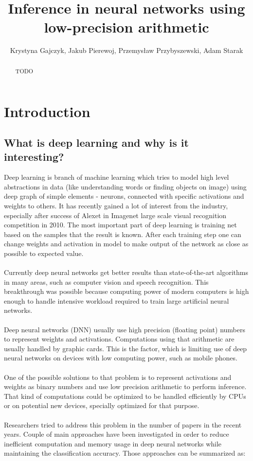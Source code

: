\documentclass[licencjacka]{pracamgr}
\title{Inference in neural networks using low-precision arithmetic}
\author{Krystyna Gajczyk, Jakub Pierewoj, Przemysław Przybyszewski, Adam Starak}
\begin{document}
\maketitle
\begin{abstract}
TODO
\end{abstract}

\tableofcontents

\chapter{Introduction}

	\section{What is deep learning and why is it interesting?}

	Deep learning is branch of machine learning which tries to model high level abstractions in data (like understanding words or finding objects on image) using deep graph of simple elements - neurons, connected with specific activations and weights to others. It has recently gained a lot of interest from the industry, especially after success of Alexet in Imagenet large scale visual recognition competition in 2010.
	The most important part of deep learning is training net based on the samples that the result is known. After each training step one can change weights and activation in model to make output of the network as close as possible to expected value.
	\\\\
	Currently deep neural networks get better results than state-of-the-art algorithms in many areas, such as computer vision and speech recognition. This breakthrough was possible because computing power of modern computers is high enough to handle intensive workload required to train large artificial neural networks.
	\\\\
	Deep neural networks (DNN) usually use high precision (floating point) numbers to represent
	weights and activations. Computations using that arithmetic are usually handled by
	graphic cards. This is the factor, which is limiting use of deep neural networks on devices with low computing power, such as mobile phones.
	\\\\
	One of the possible solutions to that problem is to represent activations and weights as
	binary numbers and use low precision arithmetic to perform inference. That kind of computations could be optimized to be handled efficiently by CPUs or on potential new devices, specially optimized for that purpose. 
	\\\\
	Researchers tried to address this problem in the number of papers in the recent years. Couple of main approaches have been investigated in order to reduce inefficient computation and memory usage in deep neural networks while maintaining the classification accuracy. Those approaches can be summarized as:
\end{document}
